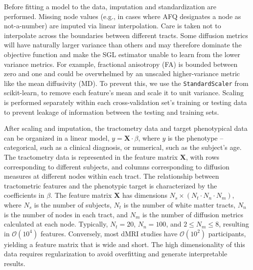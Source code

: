 Before fitting a model to the data, imputation and standardization are
performed. Missing node values (e.g., in cases where AFQ designates a node as
not-a-number) are imputed via linear interpolation. Care is taken not to
interpolate across the boundaries between different tracts. Some diffusion
metrics will have naturally larger variance than others and may therefore
dominate the objective function and make the SGL estimator unable to learn from
the lower variance metrics. For example, fractional anisotropy (FA) is bounded
between zero and one and could be overwhelmed by an unscaled higher-variance
metric like the mean diffusivity (MD). To prevent this, we use the
\lstinline{StandardScaler} from scikit-learn\cite{scikit-learn}, to remove each
feature's mean and scale it to unit variance. Scaling is performed separately
within each cross-validation set's training or testing data to prevent leakage
of information between the testing and training sets\cite{kaufman2012leakage}.

After scaling and imputation, the tractometry data and target phenotypical data
can be organized in a linear model, $y = \mathbf{X} \cdot \beta$, where $y$ is
the phenotype -- categorical, such as a clinical diagnosis, or numerical, such
as the subject's age. The tractometry data is represented in the feature matrix
$\mathbf{X}$, with rows corresponding to different subjects, and columns
corresponding to diffusion measures at different nodes within each tract. The
relationship between tractometric features and the phenotypic target is
characterized by the coefficients in $\beta$. The feature matrix $\mathbf{X}$
has dimensions $N_s \times (N_t \cdot N_n \cdot N_m)$, where $N_s$ is the number
of subjects, $N_t$ is the number of white matter tracts, $N_n$ is the number of
nodes in each tract, and $N_m$ is the number of diffusion metrics calculated at
each node. Typically, $N_t = 20$, $N_n = 100$, and $2 \le N_m \le 8$, resulting
in $\mathcal{O}(10^4)$ features. Conversely, most dMRI studies have
$\mathcal{O}(10^2)$ participants, yielding a feature matrix that is wide and
short. The high dimensionality of this data requires regularization to avoid
overfitting and generate interpretable results.

